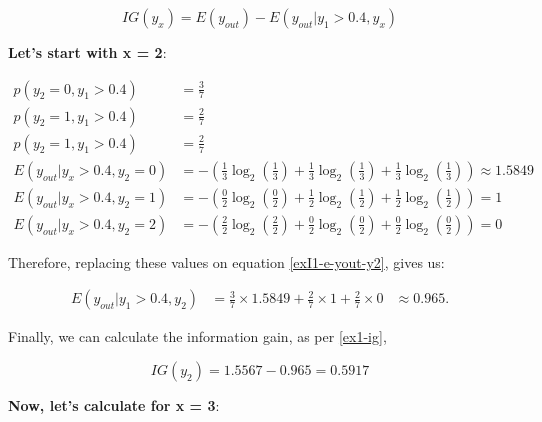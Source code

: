 \documentclass[12pt]{article}
\begin{document}
\begin{enumerate}[leftmargin=\labelsep]
    \begin{equation}\label{ex1-ig}
        IG(y_x) = E(y_{out}) - E(y_{out} |y_1 > 0.4, y_x)
    \end{equation}

    \textbf{Let's start with x = 2}:

    \[
        \begin{aligned}
            p(y_2 = 0, y_1 > 0.4)          & = \frac{3}{7}                                                                                       \\
            p(y_2 = 1, y_1 > 0.4)          & = \frac{2}{7}                                                                                       \\
            p(y_2 = 1, y_1 > 0.4)          & = \frac{2}{7}                                                                                       \\
            E(y_{out} | y_x > 0.4 , y_2 = 0) & = - \left(\frac{1}{3} \log_2\left(\frac{1}{3}\right) + \frac{1}{3} \log_2\left(\frac{1}{3}\right)
                + \frac{1}{3} \log_2\left(\frac{1}{3}\right)\right) \approx 1.5849                                                               \\
            E(y_{out} | y_x > 0.4 , y_2 = 1) & = - \left(\frac{0}{2} \log_2\left(\frac{0}{2}\right) + \frac{1}{2} \log_2\left(\frac{1}{2}\right)
                + \frac{1}{2} \log_2\left(\frac{1}{2}\right)\right) = 1                                                                          \\
            E(y_{out} | y_x > 0.4 , y_2 = 2) & = - \left(\frac{2}{2} \log_2\left(\frac{2}{2}\right) + \frac{0}{2} \log_2\left(\frac{0}{2}\right)
                + \frac{0}{2} \log_2\left(\frac{0}{2}\right)\right) = 0
        \end{aligned}
    \]

    Therefore, replacing these values on equation \eqref{exI1-e-yout-y2}, gives us:

    \[
        \begin{aligned}
            E(y_{out} | y_1>0.4, y_2) & = \frac{3}{7} \times 1.5849 + \frac{2}{7} \times 1 +  \frac{2}{7} \times 0 & \approx 0.965.
        \end{aligned}
    \]

    Finally, we can calculate the information gain, as per \eqref{ex1-ig},

    \[
        IG(y_{2}) = 1.5567 - 0.965 = 0.5917
    \]

    \textbf{Now, let's calculate for x = 3}:


\end{enumerate}
\end{document}
